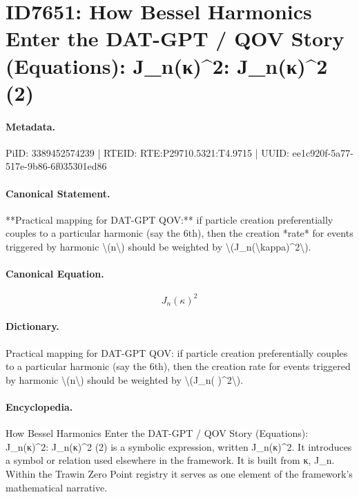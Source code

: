 \section*{ID7651: How Bessel Harmonics Enter the DAT-GPT / QOV Story (Equations): J\_n(κ)\textasciicircum{}2: J\_n(κ)\textasciicircum{}2 (2)}
\paragraph{Metadata.}
PiID: 3389452574239 | RTEID: RTE:P29710.5321:T4.9715 | UUID: ee1c920f-5a77-517e-9b86-6f035301ed86

\paragraph{Canonical Statement.}
**Practical mapping for DAT-GPT QOV:** if particle creation preferentially couples to a particular harmonic (say the 6th), then the creation *rate* for events triggered by harmonic \textbackslash{}(n\textbackslash{}) should be weighted by \textbackslash{}(J\_n(\textbackslash{}kappa)\textasciicircum{}2\textbackslash{}).

\paragraph{Canonical Equation.}
\[
J_n(\kappa)^2
\]

\paragraph{Dictionary.}
Practical mapping for DAT-GPT QOV: if particle creation preferentially couples to a particular harmonic (say the 6th), then the creation rate for events triggered by harmonic \textbackslash{}(n\textbackslash{}) should be weighted by \textbackslash{}(J\_n( )\textasciicircum{}2\textbackslash{}).

\paragraph{Encyclopedia.}
How Bessel Harmonics Enter the DAT-GPT / QOV Story (Equations): J\_n(κ)\textasciicircum{}2: J\_n(κ)\textasciicircum{}2 (2) is a symbolic expression, written J\_n(κ)\textasciicircum{}2. It introduces a symbol or relation used elsewhere in the framework. It is built from κ, J\_n. Within the Trawin Zero Point registry it serves as one element of the framework's mathematical narrative.
